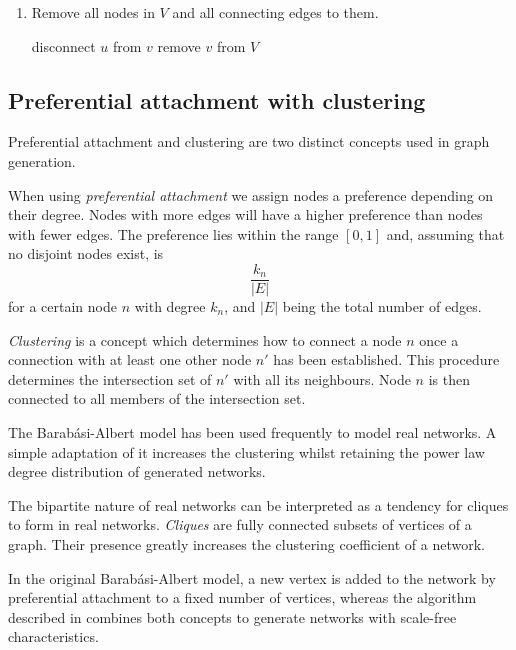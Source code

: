 \documentclass[a4paper,11pt,titlepage]{article}
\begin{document}
\begin{enumerate}
  \item Remove all nodes in $V$ and all connecting edges to them.

    \begin{algorithmic}
            \STATE disconnect $u$ from $v$
          \ENDIF
        \ENDFOR
        \STATE remove $v$ from $V$
      \ENDFOR
    \end{algorithmic}

\end{enumerate}

\subsection{Preferential attachment with clustering}

Preferential attachment and clustering are two distinct concepts used
in graph generation.

When using \emph{preferential attachment} we assign nodes a preference
depending on their degree. Nodes with more edges will have a higher
preference than nodes with fewer edges. The preference lies within the
range $[0,1]$ and, assuming that no disjoint nodes exist, is
\[ \frac{k_n}{|E|} \]
for a certain node $n$ with degree $k_n$, and $|E|$ being the total
number of edges.

\emph{Clustering} is a concept which determines how to connect a node
$n$ once a connection with at least one other node $n'$ has been
established. This procedure determines the intersection set of $n'$
with all its neighbours. Node $n$ is then connected to all members of
the intersection set.

The Barab\'{a}si-Albert model has been used frequently to model real
networks. A simple adaptation of it increases the clustering whilst
retaining the power law degree distribution of generated networks.

The bipartite nature of real networks can be interpreted as a
tendency for cliques to form in real networks. \emph{Cliques} are
fully connected subsets of vertices of a graph. Their presence
greatly increases the clustering coefficient of a network.

In the original Barab\'{a}si-Albert model, a new vertex is added to
the network by preferential attachment to a fixed number of
vertices, whereas the algorithm described in \cite{oconn11} combines
both concepts to generate networks with scale-free characteristics.
\end{document}
